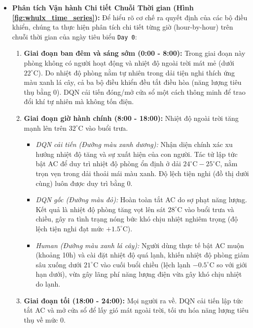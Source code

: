 \documentclass[12pt, a4paper]{article}
\begin{document}
\begin{itemize}
    \item \textbf{Phân tích Vận hành Chi tiết Chuỗi Thời gian (Hình \ref{fig:whulx_time_series}):} Để hiểu rõ cơ chế ra quyết định của các bộ điều khiển, chúng ta thực hiện phân tích chi tiết từng giờ (hour-by-hour) trên chuỗi thời gian của ngày tiêu biểu \texttt{Day 0}:
    \begin{enumerate}
        \item \textbf{Giai đoạn ban đêm và sáng sớm (0:00 - 8:00):} Trong giai đoạn này phòng không có người hoạt động và nhiệt độ ngoài trời mát mẻ (dưới $22^\circ\text{C}$). Do nhiệt độ phòng nằm tự nhiên trong dải tiện nghi thích ứng màu xanh lá cây, cả ba bộ điều khiển đều tắt điều hòa (năng lượng tiêu thụ bằng 0). DQN cải tiến đóng/mở cửa sổ một cách thông minh để trao đổi khí tự nhiên mà không tốn điện.
        \item \textbf{Giai đoạn giờ hành chính (8:00 - 18:00):} Nhiệt độ ngoài trời tăng mạnh lên trên $32^\circ\text{C}$ vào buổi trưa. 
        \begin{itemize}
            \item \textit{DQN cải tiến (Đường màu xanh dương):} Nhận diện chính xác xu hướng nhiệt độ tăng và sự xuất hiện của con người. Tác tử lập tức bật AC để duy trì nhiệt độ phòng ổn định ở dải $24^\circ\text{C} - 25^\circ\text{C}$, nằm trọn vẹn trong dải thoải mái màu xanh. Độ lệch tiện nghi (đồ thị dưới cùng) luôn được duy trì bằng 0.
            \item \textit{DQN gốc (Đường màu đỏ):} Hoàn toàn tắt AC do sợ phạt năng lượng. Kết quả là nhiệt độ phòng tăng vọt lên sát $28^\circ\text{C}$ vào buổi trưa và chiều, gây ra tình trạng nóng bức khó chịu nhiệt nghiêm trọng (độ lệch tiện nghi đạt mức $+1.5^\circ\text{C}$).
            \item \textit{Human (Đường màu xanh lá cây):} Người dùng thực tế bật AC muộn (khoảng 10h) và cài đặt nhiệt độ quá lạnh, khiến nhiệt độ phòng giảm sâu xuống dưới $21^\circ\text{C}$ vào cuối buổi chiều (lệch lạnh $-0.5^\circ\text{C}$ so với giới hạn dưới), vừa gây lãng phí năng lượng điện vừa gây khó chịu nhiệt do lạnh.
        \end{itemize}
        \item \textbf{Giai đoạn tối (18:00 - 24:00):} Mọi người ra về. DQN cải tiến lập tức tắt AC và mở cửa sổ để lấy gió mát ngoài trời, tối ưu hóa năng lượng tiêu thụ về mức 0.
    \end{enumerate}
\end{itemize}
\end{document}
